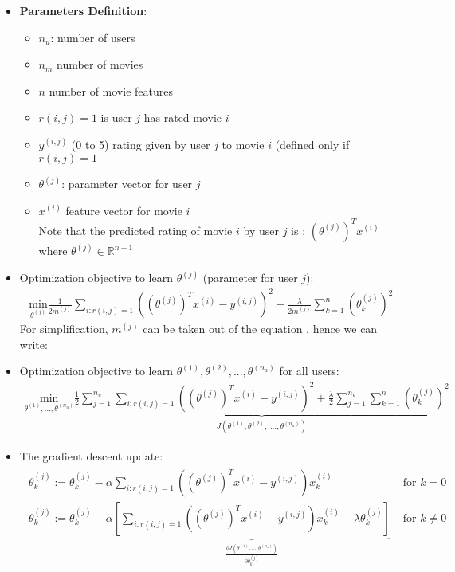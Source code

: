 \documentclass[a4paper,12pt]{report}
\begin{document}
\begin{itemize}
	\item \textbf{Parameters Definition}:
	\begin{itemize}
		\item $n_u$: number of users
		\item $n_m$ number of movies
		\item $n$ number of movie features
		\item $r(i,j) =1 $ is user $j$ has rated movie $i$
		\item $y^{(i,j)}$ (0 to 5) rating given by user $j$ to movie $i$ (defined only if  $r(i,j) = 1$
		\item $\theta^{(j)}$: parameter vector for user $j$
		\item $x^{(i)}$ feature vector for movie $i$ \\
		Note that the predicted rating of movie $i$ by user $j$ is : $(\theta^{(j)})^T x^{(i)}$ where $\theta^{(j)} \in \mathbb{R}^{n+1}$
	\end{itemize}
\end{itemize}

\begin{itemize}
	\item Optimization objective to learn $\theta^{(j)}$ (parameter for user $j$):
	\begin{align}
	\underset{\theta^{(j)}}{\text{min}} \frac{1}{2 m^{(j)}} \sum_{i:r(i,j)=1} \left( (\theta^{(j)})^T x^{(i)} - y^{(i,j)}\right)^2 + \frac{\lambda}{2 m^{(j)}} \sum_{k=1} ^n (\theta_k ^{(j)})^2
	\end{align}
For simplification, $m^{(j)}$ can be taken out of the equation , hence we can write:
	\item  Optimization objective to learn $\theta^{(1)}, \theta^{(2)}, ...,  \theta^{(n_u)} $ for all users:
	\begin{align}
	\underset{\theta^{(1)}, ..., \theta^{(n_u)}}{\text{min}} \underbrace{\frac{1}{2} \sum _{j=1} ^{n_u} \sum_{i:r(i,j)=1} \left( (\theta^{(j)})^T x^{(i)} - y^{(i,j)}\right)^2 + \frac{\lambda}{2} \sum_{j=1} ^{n_u} \sum_{k=1} ^n (\theta_k ^{(j)})^2}_{J(\theta^{(1)},\theta^{(2)}, ...., \theta^{(n_u)} )}
	\end{align}
\item The gradient descent update:
	\begin{align}
	\begin{split}
	\theta_k ^{(j)} :=  \theta_k ^{(j)} - \alpha \sum_{i:r(i,j)=1} \left( (\theta^{(j)})^T x^{(i)} - y^{(i,j)}\right) x_k ^{(i)} & \text{\ for \ } k=0 \\
	\theta_k ^{(j)} :=  \theta_k ^{(j)} - \alpha \underbrace{\left[ \sum_{i:r(i,j)=1} \left( (\theta^{(j)})^T x^{(i)} - y^{(i,j)}\right) x_k ^{(i)} + \lambda \theta_k ^{(j)}  \right]}_{\frac{\partial J(\theta^{(1)}, ..., \theta^{(n_u)})}{\partial \theta_k ^{(j)}}} & \text{\ for \ } k \neq0 \\
 	\end{split}
	\end{align}
\end{itemize}
\end{document}
